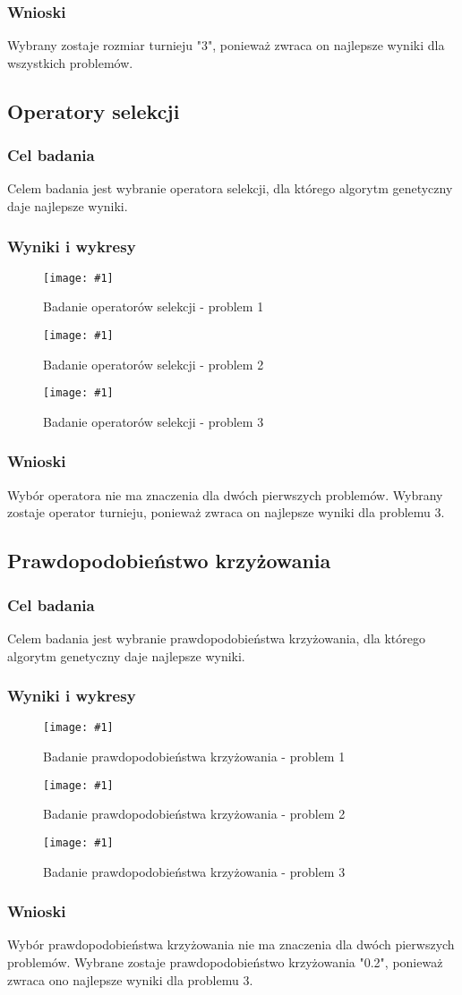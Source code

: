 \documentclass[12pt,a4paper]{article}
\newcommand{\image}[2] {
    \begin{figure}[H]
        \begin{center}
            \texttt{[image: \#1]}
        \end{center}
        \caption{#2}
        \label{#1}
    \end{figure}
}
\begin{document}
\subsubsection{Wnioski}
Wybrany zostaje rozmiar turnieju "3", ponieważ zwraca on najlepsze wyniki dla wszystkich problemów.

\subsection{Operatory selekcji}
\subsubsection{Cel badania}
Celem badania jest wybranie operatora selekcji, dla którego algorytm genetyczny daje najlepsze wyniki.
\subsubsection{Wyniki i wykresy}
\image{images/Badanie operatorów_1}{Badanie operatorów selekcji - problem 1}
\image{images/Badanie operatorów_2}{Badanie operatorów selekcji - problem 2}
\image{images/Badanie operatorów_3}{Badanie operatorów selekcji - problem 3}
\subsubsection{Wnioski}
Wybór operatora nie ma znaczenia dla dwóch pierwszych problemów.
Wybrany zostaje operator turnieju, ponieważ zwraca on najlepsze wyniki dla problemu 3.

\subsection{Prawdopodobieństwo krzyżowania}
\subsubsection{Cel badania}
Celem badania jest wybranie prawdopodobieństwa krzyżowania, dla którego algorytm genetyczny daje najlepsze wyniki.
\subsubsection{Wyniki i wykresy}
\image{images/Badanie p. krzyżowania_1}{Badanie prawdopodobieństwa krzyżowania - problem 1}
\image{images/Badanie p. krzyżowania_2}{Badanie prawdopodobieństwa krzyżowania - problem 2}
\image{images/Badanie p. krzyżowania_3}{Badanie prawdopodobieństwa krzyżowania - problem 3}
\subsubsection{Wnioski}
Wybór prawdopodobieństwa krzyżowania nie ma znaczenia dla dwóch pierwszych problemów.
Wybrane zostaje prawdopodobieństwo krzyżowania "0.2", ponieważ zwraca ono najlepsze wyniki dla problemu 3.
\end{document}
